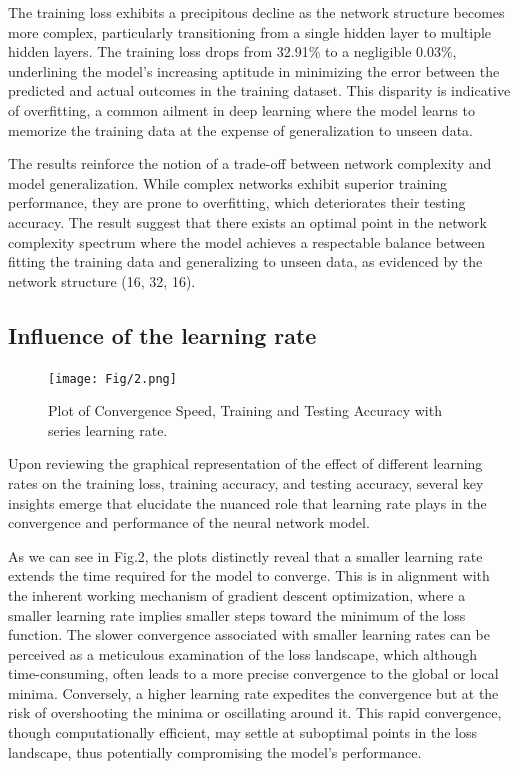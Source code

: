 \documentclass[10pt,twocolumn,letterpaper]{article}
\begin{document}
The training loss exhibits a precipitous decline as the network structure becomes more complex, particularly transitioning from a single hidden layer to multiple hidden layers. The training loss drops from 32.91\% to a negligible 0.03\%, underlining the model's increasing aptitude in minimizing the error between the predicted and actual outcomes in the training dataset. This disparity is indicative of overfitting, a common ailment in deep learning where the model learns to memorize the training data at the expense of generalization to unseen data.

The results reinforce the notion of a trade-off between network complexity and model generalization. While complex networks exhibit superior training performance, they are prone to overfitting, which deteriorates their testing accuracy. The result suggest that there exists an optimal point in the network complexity spectrum where the model achieves a respectable balance between fitting the training data and generalizing to unseen data, as evidenced by the network structure (16, 32, 16).

\subsection{Influence of the learning rate}

\begin{figure}[htbp]
   \centering
   \texttt{[image: Fig/2.png]}
   \caption{Plot of Convergence Speed, Training and Testing Accuracy with series learning rate.} \label{fig2}
\end{figure}

Upon reviewing the graphical representation of the effect of different learning rates on the training loss, training accuracy, and testing accuracy, several key insights emerge that elucidate the nuanced role that learning rate plays in the convergence and performance of the neural network model.

As we can see in Fig.2, the plots distinctly reveal that a smaller learning rate extends the time required for the model to converge. This is in alignment with the inherent working mechanism of gradient descent optimization, where a smaller learning rate implies smaller steps toward the minimum of the loss function. The slower convergence associated with smaller learning rates can be perceived as a meticulous examination of the loss landscape, which although time-consuming, often leads to a more precise convergence to the global or local minima. Conversely, a higher learning rate expedites the convergence but at the risk of overshooting the minima or oscillating around it. This rapid convergence, though computationally efficient, may settle at suboptimal points in the loss landscape, thus potentially compromising the model's performance.
\end{document}
